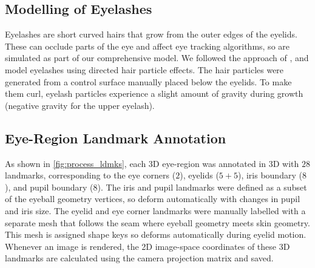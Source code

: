 \subsection{Modelling of Eyelashes}

Eyelashes are short curved hairs that grow from the outer edges of the eyelids.
These can occlude parts of the eye and affect eye tracking algorithms, so are simulated as part of our comprehensive model.
We followed the approach of \citet{swirski2014rendering}, and model eyelashes using directed hair particle effects.
The hair particles were generated from a control surface manually placed below the eyelids.
To make them curl, eyelash particles experience a slight amount of gravity during growth (negative gravity for the upper eyelash).

\subsection{Eye-Region Landmark Annotation}

As shown in \autoref{fig:process_ldmks}, each 3D eye-region was annotated in 3D with $28$ landmarks, corresponding to the eye corners ($2$), eyelids ($5\!+\!5$), iris boundary ($8$), and pupil boundary ($8$).
The iris and pupil landmarks were defined as a subset of the eyeball geometry vertices, so deform automatically with changes in pupil and iris size.
The eyelid and eye corner landmarks were manually labelled with a separate mesh that follows the seam where eyeball geometry meets skin geometry.
This mesh is assigned shape keys so deforms automatically during eyelid motion.
%
Whenever an image is rendered, the 2D image-space coordinates of these 3D landmarks are calculated using the camera projection matrix and saved.